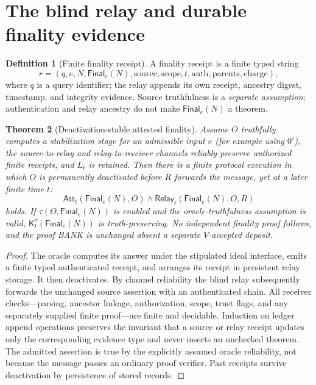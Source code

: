 \documentclass[11pt,letterpaper]{article}
\newtheorem{theorem}{Theorem}[section]
\theoremstyle{definition}
\newtheorem{definition}[theorem]{Definition}
\theoremstyle{remark}
\newcommand{\Fin}{\mathsf{Final}}
\newcommand{\Att}{\mathsf{Att}}
\newcommand{\Relay}{\mathsf{Relay}}
\newcommand{\Ktau}{\mathsf K^{\tau}}
\begin{document}
\section{The blind relay and durable finality evidence}
\begin{definition}[Finite finality receipt]
A finality receipt is a finite typed string
\[
r=(q,e,N,\Fin_e(N),\text{source},\text{scope},t,\text{auth},\text{parents},\text{charge}),
\]
where $q$ is a query identifier; the relay appends its own receipt, ancestry digest, timestamp, and integrity evidence. Source truthfulness is a \emph{separate assumption}; authentication and relay ancestry do not make $\Fin_e(N)$ a theorem.
\end{definition}
\begin{theorem}[Deactivation-stable attested finality]
Assume $O$ truthfully computes a stabilization stage for an admissible input $e$ (for example using $0'$), the source-to-relay and relay-to-receiver channels reliably preserve authorized finite receipts, and $L_t$ is retained. Then there is a finite protocol execution in which $O$ is permanently deactivated before $R$ forwards the message, yet at a later finite time $t$:
\[
\Att_t(\Fin_e(N),O)\land\Relay_t(\Fin_e(N),O,R)
\]
holds. If $\tau(O,\Fin_e(N))$ is enabled and the oracle-truthfulness assumption is valid, $\Ktau_t(\Fin_e(N))$ is truth-preserving. No independent finality proof follows, and the proof BANK is unchanged absent a separate $V$-accepted deposit.
\end{theorem}
\begin{proof}
The oracle computes its answer under the stipulated ideal interface, emits a finite typed authenticated receipt, and arranges its receipt in persistent relay storage. It then deactivates. By channel reliability the blind relay subsequently forwards the unchanged source assertion with an authenticated chain. All receiver checks---parsing, ancestor linkage, authorization, scope, trust flags, and any separately supplied finite proof---are finite and decidable. Induction on ledger append operations preserves the invariant that a source or relay receipt updates only the corresponding evidence type and never inserts an unchecked theorem. The admitted assertion is true by the explicitly assumed oracle reliability, not because the message passes an ordinary proof verifier. Past receipts survive deactivation by persistence of stored records.
\end{proof}
\end{document}
